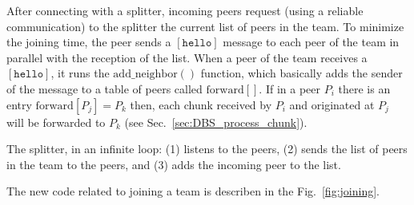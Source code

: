 \label{sec:joining}

After connecting with a splitter, incoming peers request (using a
reliable communication) to the splitter the current list of peers in
the team. To minimize the joining time, the peer sends a
$[\mathtt{hello}]$ message to each peer of the team in parallel with
the reception of the list. When a peer of the team receives a
$[\mathtt{hello}]$, it runs the $\mathrm{add}\_\mathrm{neighbor}()$
function, which basically adds the sender of the message to a table of
peers called $\mathrm{forward}[]$. If in a peer $P_i$ there is an
entry $\mathrm{forward}[P_j]=P_k$ then, each chunk received by $P_i$
and originated at $P_j$ will be forwarded to $P_k$ (see
Sec.~\ref{sec:DBS_process_chunk}).


The splitter, in an infinite loop: (1) listens to the peers, (2) sends
the list of peers in the team to the peers, and (3) adds the incoming peer
to the list.

\begin{figure*}
   \caption{Code related to team
    joining.\label{fig:joining}}
\end{figure*}

The new code related to joining a team is describen in the
Fig.~\ref{fig:joining}.

